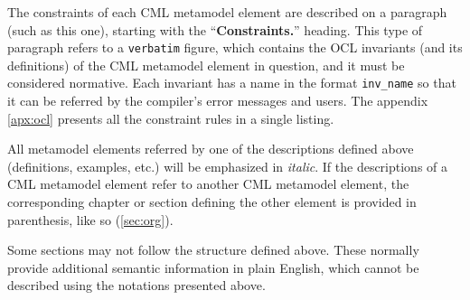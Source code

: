\begin{constraints}
The constraints of each CML metamodel element are described
on a paragraph (such as this one),
starting with the ``\textbf{Constraints.}'' heading.
This type of paragraph refers to a \verb+verbatim+ figure,
which contains the OCL \cite{ocl} invariants
(and its definitions)
of the CML metamodel element in question,
and it must be considered normative.
Each invariant has a name in the format \verb+inv_name+
so that it can be referred by the compiler's error messages
and users.
The appendix \ref{apx:ocl} presents all the constraint rules
in a single listing.
\end{constraints}

All metamodel elements referred by one of the descriptions defined above
(definitions, examples, etc.)
will be emphasized in \emph{italic}.
If the descriptions of a CML metamodel element refer to another CML metamodel element,
the corresponding chapter or section defining the other element
is provided in parenthesis, like so (\ref{sec:org}).

Some sections may not follow the structure defined above.
These normally provide additional semantic information in plain English,
which cannot be described using the notations presented above.
